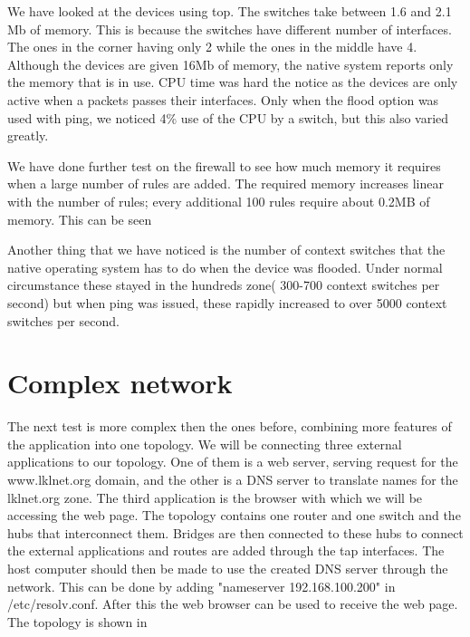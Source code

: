 We have looked at the devices using top. The switches take between 1.6 and 2.1 Mb of memory. This is
because the switches have different number of interfaces. The ones in the corner having only 2 while
the ones in the middle have 4. Although the devices are given 16Mb of memory, the native system 
reports only the memory that is in use. CPU time was hard the notice as the devices are only active
when a packets passes their interfaces. Only when the flood option was used with ping, we noticed
4\% use of the CPU by a switch, but this also varied greatly. 

We have done further test on the firewall to see how much memory it requires when a large number
of rules are added. The required memory increases linear with the number of rules; every additional
100 rules require about 0.2MB of memory. This can be seen 

Another thing that we have noticed is the number of context switches that the native operating
system has to do when the device was flooded. Under normal circumstance these stayed in the hundreds
zone( 300-700 context switches per second) but when ping was issued, these rapidly increased to over
5000 context switches per second.


\section{Complex network}
\label{sec:complex-network}

The next test is more complex then the ones before, combining more features of the application into
one topology. We will be connecting three external applications to our \textbf{\project} topology. One of
them is a web server, serving request for the www.lklnet.org domain, and the other is a DNS server to
translate names for the lklnet.org zone. The third application is the browser with which we will
be accessing the web page. The \textbf{\project} topology contains one router and one switch and the hubs
that interconnect them. Bridges are then connected to these hubs to connect the external applications and
routes are added through the tap interfaces. The host computer should then be made to use the created
DNS server through the \textbf{\project} network. This can be done by adding "nameserver 192.168.100.200"
in /etc/resolv.conf. After this the web browser can be used to receive the web page. The topology is shown
in 

